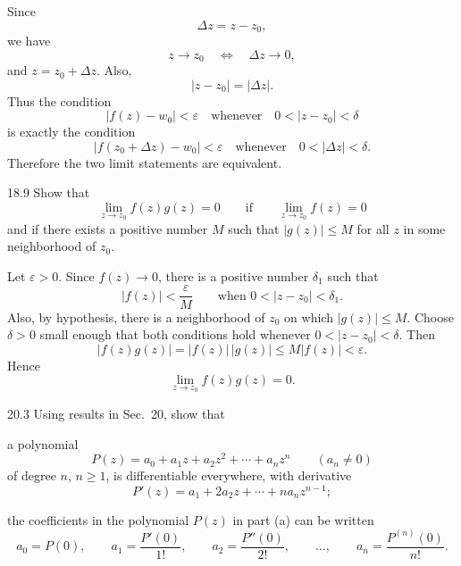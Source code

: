 \documentclass[11pt,oneside]{article}
\begin{document}
\begin{solution}
Since
\[
    \Delta z=z-z_0,
\]
we have
\[
    z\to z_0
    \quad\Longleftrightarrow\quad
    \Delta z\to0,
\]
and \(z=z_0+\Delta z\). Also,
\[
    |z-z_0|=|\Delta z|.
\]
Thus the condition
\[
    |f(z)-w_0|<\varepsilon
    \quad\text{whenever}\quad
    0<|z-z_0|<\delta
\]
is exactly the condition
\[
    |f(z_0+\Delta z)-w_0|<\varepsilon
    \quad\text{whenever}\quad
    0<|\Delta z|<\delta.
\]
Therefore the two limit statements are equivalent.
\end{solution}

\begin{exercise}{18.9}
Show that
\[
    \lim_{z\to z_0}f(z)g(z)=0
    \qquad\text{if}\qquad
    \lim_{z\to z_0}f(z)=0
\]
and if there exists a positive number \(M\) such that \(|g(z)|\le M\) for all \(z\) in some neighborhood of \(z_0\).
\end{exercise}

\begin{solution}
Let \(\varepsilon>0\). Since \(f(z)\to0\), there is a positive number \(\delta_1\) such that
\[
    |f(z)|<\frac\varepsilon M
    \qquad\text{when }0<|z-z_0|<\delta_1.
\]
Also, by hypothesis, there is a neighborhood of \(z_0\) on which \(|g(z)|\le M\). Choose \(\delta>0\) small enough that both conditions hold whenever \(0<|z-z_0|<\delta\). Then
\[
    |f(z)g(z)|=|f(z)|\,|g(z)|
    \le M|f(z)|
    <\varepsilon.
\]
Hence
\[
    \boxed{\lim_{z\to z_0}f(z)g(z)=0}.
\]
\end{solution}

\begin{exercise}{20.3}
Using results in Sec.~20, show that
\begin{exercisesubparts}
    \item a polynomial
    \[
        P(z)=a_0+a_1z+a_2z^2+\cdots+a_nz^n
        \qquad(a_n\ne0)
    \]
    of degree \(n\), \(n\ge1\), is differentiable everywhere, with derivative
    \[
        P'(z)=a_1+2a_2z+\cdots+na_nz^{n-1};
    \]
    \item the coefficients in the polynomial \(P(z)\) in part (a) can be written
    \[
        a_0=P(0), \qquad
        a_1=\frac{P'(0)}{1!}, \qquad
        a_2=\frac{P''(0)}{2!}, \qquad
        \ldots, \qquad
        a_n=\frac{P^{(n)}(0)}{n!}.
    \]
\end{exercisesubparts}
\end{exercise}
\end{document}
